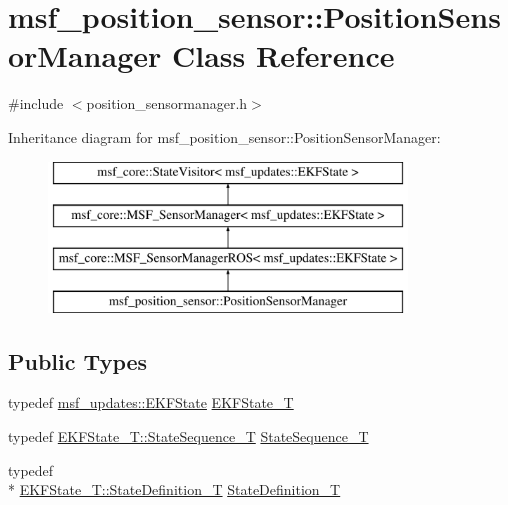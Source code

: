 \hypertarget{classmsf__position__sensor_1_1PositionSensorManager}{\section{msf\-\_\-position\-\_\-sensor\-:\-:Position\-Sensor\-Manager Class Reference}
\label{classmsf__position__sensor_1_1PositionSensorManager}
}


{\ttfamily \#include $<$position\-\_\-sensormanager.\-h$>$}

Inheritance diagram for msf\-\_\-position\-\_\-sensor\-:\-:Position\-Sensor\-Manager\-:\begin{figure}[H]
\begin{center}
\leavevmode
\includegraphics[height=4.000000cm]{classmsf__position__sensor_1_1PositionSensorManager}
\end{center}
\end{figure}
\subsection*{Public Types}
\begin{DoxyCompactItemize}
\item 
typedef \hyperlink{namespacemsf__updates_a03b0801c76b7400623b00ad4d28f9bcc}{msf\-\_\-updates\-::\-E\-K\-F\-State} \hyperlink{classmsf__position__sensor_1_1PositionSensorManager_abf67877833d9fa2ce0afda2fd8f92bae}{E\-K\-F\-State\-\_\-\-T}
\item 
typedef \hyperlink{structmsf__core_1_1GenericState__T_a75fe70f7c7517dbf7d4c91b75b08a1dd}{E\-K\-F\-State\-\_\-\-T\-::\-State\-Sequence\-\_\-\-T} \hyperlink{classmsf__position__sensor_1_1PositionSensorManager_a644958b0af6bb4808907ac8b3b661caf}{State\-Sequence\-\_\-\-T}
\item 
typedef \\*
\hyperlink{structmsf__core_1_1GenericState__T_a9a7d65b0325658ab07b81960a3ed4604}{E\-K\-F\-State\-\_\-\-T\-::\-State\-Definition\-\_\-\-T} \hyperlink{classmsf__position__sensor_1_1PositionSensorManager_a1fde9f23ab4df16520ec13102262d04c}{State\-Definition\-\_\-\-T}
\end{DoxyCompactItemize}
